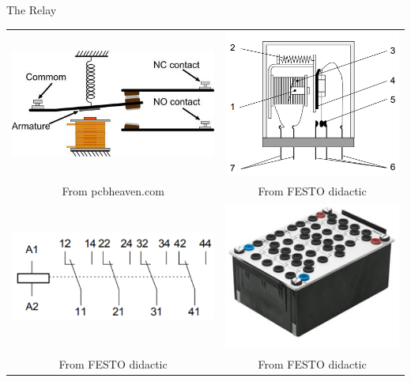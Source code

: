 \documentclass[presentation,aspectratio=1610]{beamer}
\begin{document}
\begin{frame}[label={sec:org004eecc}]{The Relay}
\begin{center}
\begin{tabular}{cc}
\includegraphics[width=0.4\linewidth]{../../figures/howrelayswork.jpg} &
\includegraphics[width=0.3\linewidth]{../../figures/festo-relay-principle.png}\\
{\tiny From pcbheaven.com} & {\tiny From FESTO didactic}\\
\includegraphics[width=0.35\linewidth]{../../figures/festo-relay-switches.png} &
\includegraphics[width=0.25\linewidth]{../../figures/festo-relay-box.jpg}\\
{\tiny From FESTO didactic} & {\tiny From FESTO didactic}\\
\end{tabular}
\end{center}
\end{frame}
\end{document}
